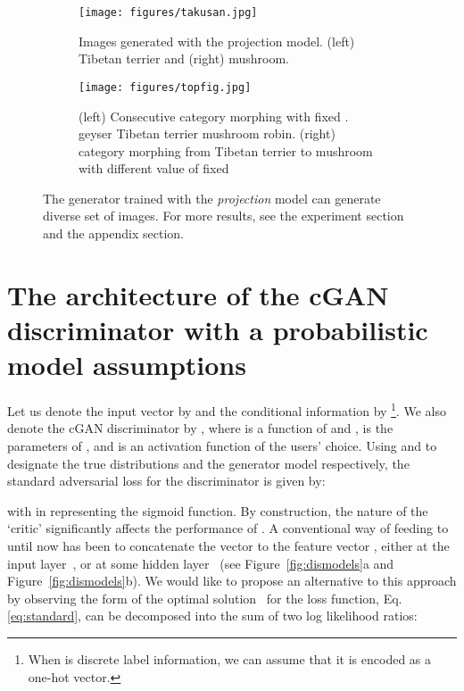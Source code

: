 \documentclass{article}
\begin{document}
\begin{figure}[t]
    \begin{subfigure}{\textwidth}
    	\centering
    	\texttt{[image: figures/takusan.jpg]}
    	\caption{\label{fig:topfig1}Images generated with the projection model.  
    	(left) Tibetan terrier and (right) mushroom.}
    \end{subfigure}
    
	\begin{subfigure}{\textwidth}
	    \centering
	    \texttt{[image: figures/topfig.jpg]}
	    \caption{\label{fig:topfig3}(left) Consecutive category morphing with fixed . geyser  Tibetan terrier  mushroom  robin. (right) category morphing from Tibetan terrier to mushroom with different value of  fixed  }
	\end{subfigure}
    \caption{\label{fig:topfig}  
    The generator trained with the \textit{projection} model can generate diverse set of images. For more results, see the experiment section and the appendix section.}
\end{figure}

\section{The architecture of the cGAN discriminator with a probabilistic model assumptions}
Let us denote the input vector by  and the conditional information by \footnote{When  is discrete label information, we can assume that it is  encoded as a one-hot vector.}.
We also denote the cGAN discriminator by  , 
where  is a function of  and ,  is the parameters of , and 
 is an activation function of the users' choice.
Using  and  to designate the true distributions and the generator model respectively, the standard adversarial loss for the discriminator is given by: 

with  in  representing the sigmoid function.
By construction, the nature of the `critic'  significantly affects the performance of .
A conventional way of feeding  to  until now has been to concatenate the vector  to the feature vector , either at the input layer~\cite[]{mirza2014conditional, denton2015deep, saito2016temporal}, or at some hidden layer~\cite[]{reed2016generative, zhang2016stackgan, perarnau2016invertible,
dumoulin2016adversarially, sricharan2017semi} (see Figure~\ref{fig:dismodels}a and Figure~\ref{fig:dismodels}b).
We would like to propose an alternative to this approach by observing the form of the optimal solution~\cite[]{goodfellow2014generative} for the loss function, Eq. \eqref{eq:standard}, can be decomposed into the sum of two log likelihood ratios:
\end{document}
